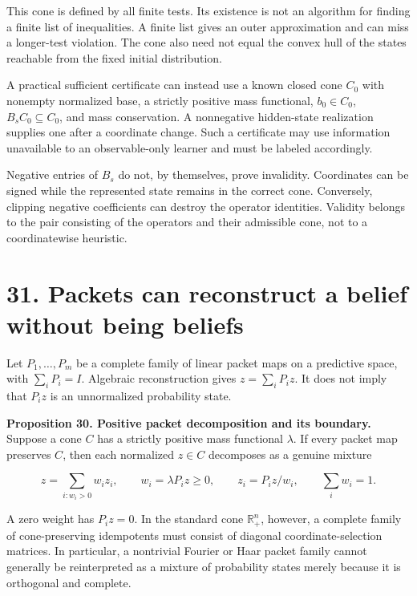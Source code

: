 \documentclass[11pt,letterpaper]{article}
\begin{document}
This cone is defined by all finite tests. Its existence is not an
algorithm for finding a finite list of inequalities. A finite list gives
an outer approximation and can miss a longer-test violation. The cone
also need not equal the convex hull of the states reachable from the
fixed initial distribution.

A practical sufficient certificate can instead use a known closed cone
\(C_0\) with nonempty normalized base, a strictly positive mass
functional, \(b_0\in C_0\), \(B_sC_0\subseteq C_0\), and mass
conservation. A nonnegative hidden-state realization supplies one after
a coordinate change. Such a certificate may use information unavailable
to an observable-only learner and must be labeled accordingly.

Negative entries of \(B_s\) do not, by themselves, prove invalidity.
Coordinates can be signed while the represented state remains in the
correct cone. Conversely, clipping negative coefficients can destroy the
operator identities. Validity belongs to the pair consisting of the
operators and their admissible cone, not to a coordinatewise heuristic.

\section{31. Packets can reconstruct a belief without being
beliefs}\label{packets-can-reconstruct-a-belief-without-being-beliefs}

Let \(P_1,\ldots,P_m\) be a complete family of linear packet maps on a
predictive space, with \(\sum_iP_i=I\). Algebraic reconstruction gives
\(z=\sum_iP_iz\). It does not imply that \(P_iz\) is an unnormalized
probability state.

\textbf{Proposition 30. Positive packet decomposition and its boundary.}
Suppose a cone \(C\) has a strictly positive mass functional
\(\lambda\). If every packet map preserves \(C\), then each normalized
\(z\in C\) decomposes as a genuine mixture

\[
z=\sum_{i:w_i>0} w_i z_i,\qquad
w_i=\lambda P_iz\geq0,\qquad
z_i=P_iz/w_i,\qquad\sum_iw_i=1.
\]

A zero weight has \(P_iz=0\). In the standard cone \(\mathbb R^n_+\),
however, a complete family of cone-preserving idempotents must consist
of diagonal coordinate-selection matrices. In particular, a nontrivial
Fourier or Haar packet family cannot generally be reinterpreted as a
mixture of probability states merely because it is orthogonal and
complete.
\end{document}
